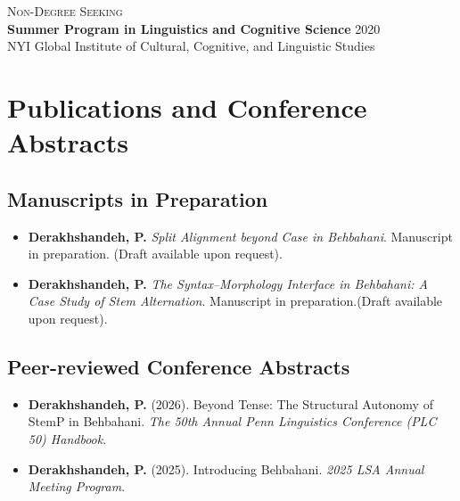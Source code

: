 \documentclass[a4paper,10pt]{article}
\begin{document}
\vspace{4pt}

\noindent \textsc{Non-Degree Seeking}\\
\textbf{Summer Program in Linguistics and Cognitive Science} \hfill 2020 \\
NYI Global Institute of Cultural, Cognitive, and Linguistic Studies

\section*{Publications and Conference Abstracts}
\subsection*{Manuscripts in Preparation}
\begin{itemize}[leftmargin=0.5cm]
  \item \textbf{Derakhshandeh, P.} \textit{Split Alignment beyond Case in Behbahani}. 
    Manuscript in preparation. (Draft available upon request).

    \item \textbf{Derakhshandeh, P.} \textit{The Syntax–Morphology Interface in Behbahani: A Case Study of Stem Alternation}. 
    Manuscript in preparation.(Draft available upon request).

\end{itemize}
\subsection*{Peer-reviewed Conference Abstracts}
\begin{itemize}[leftmargin=0.5cm, itemsep=0.3em]
    \item \textbf{Derakhshandeh, P.} (2026). Beyond Tense: The Structural Autonomy of StemP in Behbahani. \textit{The 50th Annual Penn Linguistics Conference (PLC 50) Handbook}.
    
    \item \textbf{Derakhshandeh, P.} (2025). Introducing Behbahani. \textit{2025 LSA Annual Meeting Program}.
\end{itemize}
\end{document}
